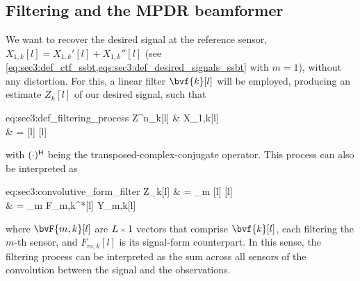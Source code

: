 \subsection{Filtering and the MPDR beamformer}

We want to recover the desired signal at the reference sensor, $X_{1,k}[l] = X_{1,k}'[l] + X_{1,k}''[l]$ (see \cref{eq:sec3:def_ctf_ssbt,eqs:sec3:def_desired_signals_ssbt} with $m=1$), without any distortion. For this, a linear filter $\bvf{k}[l]$ will be employed, producing an estimate $Z_{k}[l]$ of our desired signal, such that
\begin{equations}{eq:sec3:def_filtering_process}
	Z^n_{k}[l]
	& \approx X_{1,k}[l] \\
	& =  
\end{equations}
with $\he{(\cdot)}$ being the transposed-complex-conjugate operator. This process can also be interpreted as
\begin{equations}{eq:sec3:convolutive_form_filter}
	Z_{k}[l]
	& = \sum_{m}   \\
	& = \sum_{m} F_{m,k}^*[l] \ast Y_{m,k}[l]
\end{equations}
where $\bvF{m,k}[l]$ are $\sz{L}{1}$ vectors that comprise $\bvf{k}[l]$, each filtering the $m$-th sensor, and $F_{m,k}[l]$ is its signal-form counterpart. In this sense, the filtering process can be interpreted as the sum across all sensors of the convolution between the signal and the observations.

